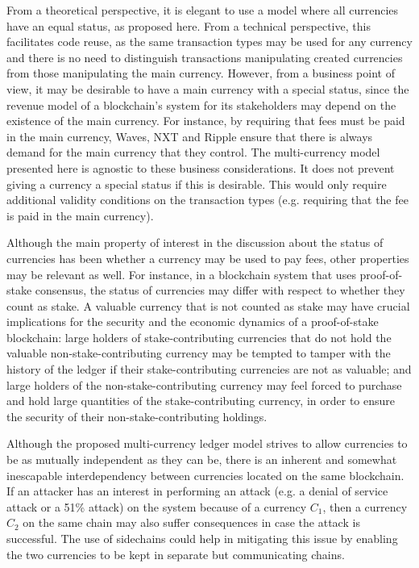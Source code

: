 \documentclass{llncs}
\begin{document}
From a theoretical perspective, it is elegant to use a model where all currencies have an equal status, as proposed here. From a technical perspective, this facilitates code reuse, as the same transaction types may be used for any currency and there is no need to distinguish transactions manipulating created currencies from those manipulating the main currency. However, from a business point of view, it may be desirable to have a main currency with a special status, since the revenue model of a blockchain's system for its stakeholders may depend on the existence of the main currency. For instance, by requiring that fees must be paid in the main currency, Waves, NXT and Ripple ensure that there is always demand for the main currency that they control. The multi-currency model presented here is agnostic to these business considerations. It does not prevent giving a currency a special status if this is desirable. This would only require additional validity conditions on the transaction types (e.g. requiring that the fee is paid in the main currency).

Although the main property of interest in the discussion about the status of currencies has been whether a currency may be used to pay fees, other properties may be relevant as well. For instance, in a blockchain system that uses proof-of-stake consensus, the status of currencies may differ with respect to whether they count as stake. A valuable currency that is not counted as stake may have crucial implications for the security and the economic dynamics of a proof-of-stake blockchain: large holders of stake-contributing currencies that do not hold the valuable non-stake-contributing currency may be tempted to tamper with the history of the ledger if their stake-contributing currencies are not as valuable; and large holders of the non-stake-contributing currency may feel forced to purchase and hold large quantities of the stake-contributing currency, in order to ensure the security of their non-stake-contributing holdings.

Although the proposed multi-currency ledger model strives to allow currencies to be as mutually independent as they can be, there is an inherent and somewhat inescapable interdependency between currencies located on the same blockchain. If an attacker has an interest in performing an attack (e.g. a denial of service attack or a 51\% attack) on the system because of a currency $C_1$, then a currency $C_2$ on the same chain may also suffer consequences in case the attack is successful. The use of sidechains \cite{Sidechains,SidechainsOuroboros} could help in mitigating this issue by enabling the two currencies to be kept in separate but communicating chains.
\end{document}
